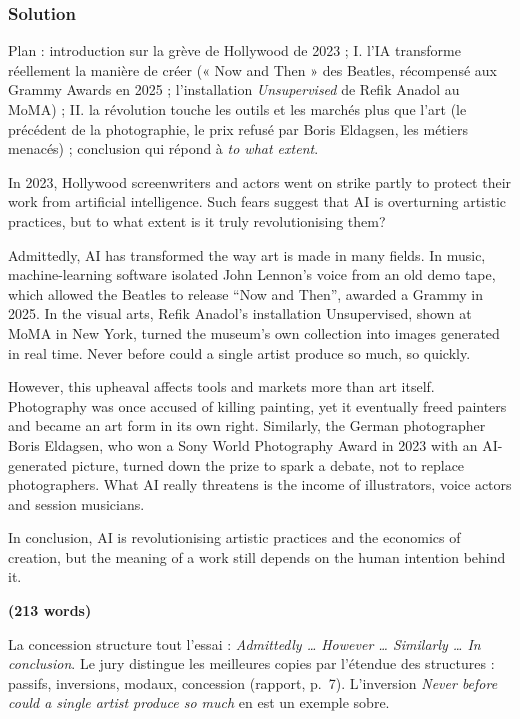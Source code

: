 \documentclass[11pt,a4paper]{article}
\begin{document}
\hypertarget{solution-3}{%
\subsubsection{Solution}\label{solution-3}}

Plan : introduction sur la grève de Hollywood de 2023 ; I. l'IA transforme réellement la manière de créer (« Now and Then » des Beatles, récompensé aux Grammy Awards en 2025 ; l'installation \emph{Unsupervised} de Refik Anadol au MoMA) ; II. la révolution touche les outils et les marchés plus que l'art (le précédent de la photographie, le prix refusé par Boris Eldagsen, les métiers menacés) ; conclusion qui répond à \emph{to what extent}.

In 2023, Hollywood screenwriters and actors went on strike partly to protect their work from artificial intelligence. Such fears suggest that AI is overturning artistic practices, but to what extent is it truly revolutionising them?

Admittedly, AI has transformed the way art is made in many fields. In music, machine-learning software isolated John Lennon's voice from an old demo tape, which allowed the Beatles to release ``Now and Then'', awarded a Grammy in 2025. In the visual arts, Refik Anadol's installation Unsupervised, shown at MoMA in New York, turned the museum's own collection into images generated in real time. Never before could a single artist produce so much, so quickly.

However, this upheaval affects tools and markets more than art itself. Photography was once accused of killing painting, yet it eventually freed painters and became an art form in its own right. Similarly, the German photographer Boris Eldagsen, who won a Sony World Photography Award in 2023 with an AI-generated picture, turned down the prize to spark a debate, not to replace photographers. What AI really threatens is the income of illustrators, voice actors and session musicians.

In conclusion, AI is revolutionising artistic practices and the economics of creation, but the meaning of a work still depends on the human intention behind it.

\textbf{(213 words)}

\begin{methode}

La concession structure tout l'essai : \emph{Admittedly \ldots{} However \ldots{} Similarly \ldots{} In conclusion}. Le jury distingue les meilleures copies par l'étendue des structures : passifs, inversions, modaux, concession (rapport, p.~7). L'inversion \emph{Never before could a single artist produce so much} en est un exemple sobre.

\end{methode}
\end{document}
